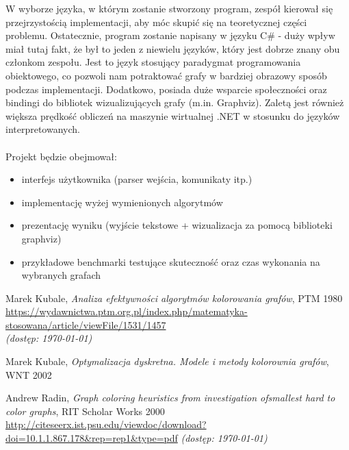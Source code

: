 \documentclass[10pt,a4paper]{article}
\begin{document}
	W wyborze języka, w którym zostanie stworzony program, zespół kierował się przejrzystością implementacji, aby móc skupić się na teoretycznej części problemu. Ostatecznie, program zostanie napisany w języku C\# - duży wpływ miał tutaj fakt, że był to jeden z niewielu języków, który jest dobrze znany obu członkom zespołu. Jest to język stosujący paradygmat programowania obiektowego, co pozwoli nam potraktować grafy w bardziej obrazowy sposób podczas implementacji. Dodatkowo, posiada duże wsparcie społeczności oraz bindingi do bibliotek wizualizujących grafy (m.in. Graphviz). Zaletą jest również większa prędkość obliczeń na maszynie wirtualnej .NET w stosunku do języków interpretowanych.
	\\~\\
	Projekt będzie obejmował:
	\begin{itemize}
		\item interfejs użytkownika (parser wejścia, komunikaty itp.)
		\item implementację wyżej wymienionych algorytmów 
		\item prezentację wyniku (wyjście tekstowe + wizualizacja za pomocą biblioteki graphviz)
		\item przykładowe benchmarki testujące skuteczność oraz czas wykonania na wybranych grafach
	\end{itemize}

	\vfill
	
	\begin{thebibliography}{0}
		Marek Kubale, \textit{Analiza efektywności algorytmów kolorowania grafów}, PTM 1980\\
		\url{https://wydawnictwa.ptm.org.pl/index.php/matematyka-stosowana/article/viewFile/1531/1457}\\
		\textit{(dostęp: \today)}
		
		Marek Kubale, \textit{Optymalizacja dyskretna. Modele i metody kolorownia grafów}, WNT 2002
		
		Andrew Radin, \textit{Graph coloring heuristics from investigation ofsmallest hard to color graphs}, RIT Scholar Works 2000
		\url{http://citeseerx.ist.psu.edu/viewdoc/download?doi=10.1.1.867.178\&rep=rep1\&type=pdf}
		\textit{(dostęp: \today)}
		
		
	\end{thebibliography}
	
\end{document}
